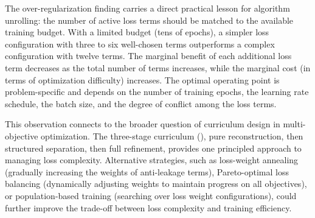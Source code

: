 The over-regularization finding carries a direct practical lesson for algorithm unrolling: the number of active loss terms should be matched to the available training budget. With a limited budget (tens of epochs), a simpler loss configuration with three to six well-chosen terms outperforms a complex configuration with twelve terms. The marginal benefit of each additional loss term decreases as the total number of terms increases, while the marginal cost (in terms of optimization difficulty) increases. The optimal operating point is problem-specific and depends on the number of training epochs, the learning rate schedule, the batch size, and the degree of conflict among the loss terms.

This observation connects to the broader question of curriculum design in multi-objective optimization. The three-stage curriculum (), pure reconstruction, then structured separation, then full refinement, provides one principled approach to managing loss complexity. Alternative strategies, such as loss-weight annealing (gradually increasing the weights of anti-leakage terms), Pareto-optimal loss balancing (dynamically adjusting weights to maintain progress on all objectives), or population-based training (searching over loss weight configurations), could further improve the trade-off between loss complexity and training efficiency.
